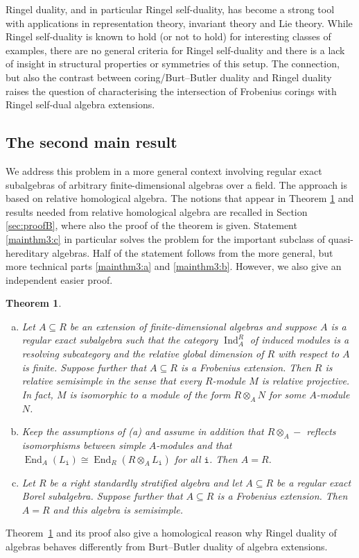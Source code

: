 \documentclass[12pt,a4paper]{amsart}
\theoremstyle{plain}
\newtheorem{thm}{Theorem}[section]
\theoremstyle{definition}
\numberwithin{equation}{thm}
\DeclareMathOperator{\End}{End}
\DeclareMathOperator{\Ind}{Ind}
\begin{document}
{Ringel duality, and in particular Ringel self-duality, has become a strong tool
with applications in representation theory, invariant theory and Lie theory.
While Ringel self-duality is known to hold (or not to hold) for interesting
classes of examples, there are no general criteria for Ringel self-duality
and there is a lack of insight in structural properties or symmetries of
this setup. The connection, but also the contrast between coring/Burt--Butler duality and Ringel duality raises the question of characterising the intersection of Frobenius corings with Ringel self-dual algebra extensions.

\subsection*{The second main result} We address this problem in a more general context
involving regular exact subalgebras of arbitrary finite-dimensional algebras over a field.
The approach is based on relative homological algebra. The notions that
appear in Theorem \ref{mainthm3} and results needed from relative
homological algebra are recalled in Section \ref{sec:proofB},
where also the proof of the
theorem is given.  Statement \eqref{mainthm3:c} in particular solves the problem  for the important subclass of quasi-hereditary algebras. Half of the statement follows from the more general, but more technical parts \eqref{mainthm3:a} and \eqref{mainthm3:b}. However, we also give an independent easier proof. 

\renewcommand*{\thethm}{\Alph{thm}}
\begin{thm} \label{mainthm3}
\begin{enumerate}[(a)]
\item\label{mainthm3:a} Let $A\subseteq R$ be an extension of finite-dimensional algebras and
  suppose $A$ is a regular exact subalgebra such that the category  $\Ind_A^R$ of induced modules is a
  resolving subcategory and the relative global dimension of $R$ with respect to $A$ is finite. Suppose further
  that $A\subseteq R$ is a Frobenius extension. 
  Then $R$ is relative semisimple in the sense that every $R$-module $M$ is
  relative projective. In fact, $M$ is isomorphic to a module of the form
  $R\otimes_A N$ for some $A$-module $N$. 
\item\label{mainthm3:b}  Keep the assumptions of (a) and assume in addition that $R\otimes_A -$ 
  reflects isomorphisms between simple $A$-modules and that 
  $\End_A(L_\mathtt{i})\cong\End_R(R\otimes_A L_\mathtt{i})$ for all $\mathtt{i}$. Then
  $A=R$. 

\item\label{mainthm3:c} Let $R$ be a right standardly stratified algebra and let $A\subseteq R$ be a
  regular exact Borel subalgebra. Suppose further that $A\subseteq R$ is a
  Frobenius extension. Then $A=R$ and this algebra is semisimple.
  \end{enumerate}
\end{thm}

Theorem~\ref{mainthm3} and its proof also give a homological
reason why Ringel duality
of algebras behaves differently from Burt--Butler duality of algebra  extensions.

\medskip
}
\end{document}
